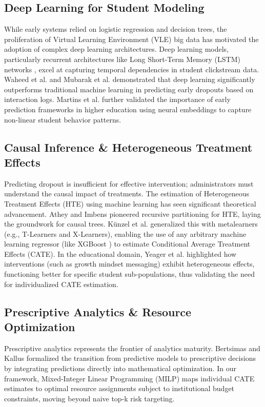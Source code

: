 \documentclass[11pt, a4paper]{article}
\begin{document}
\subsection{Deep Learning for Student Modeling}
While early systems relied on logistic regression and decision trees, the proliferation of Virtual Learning Environment (VLE) big data has motivated the adoption of complex deep learning architectures. Deep learning models, particularly recurrent architectures like Long Short-Term Memory (LSTM) networks \cite{hochreiter1997lstm}, excel at capturing temporal dependencies in student clickstream data. Waheed et al. \cite{waheed2020predicting} and Mubarak et al. \cite{mubarak2022deep} demonstrated that deep learning significantly outperforms traditional machine learning in predicting early dropouts based on interaction logs. Martins et al. \cite{martins2021early} further validated the importance of early prediction frameworks in higher education using neural embeddings to capture non-linear student behavior patterns.

\subsection{Causal Inference \texorpdfstring{\&}{and} Heterogeneous Treatment Effects}
Predicting dropout is insufficient for effective intervention; administrators must understand the causal impact of treatments. The estimation of Heterogeneous Treatment Effects (HTE) using machine learning has seen significant theoretical advancement. Athey and Imbens \cite{athey2016recursive} pioneered recursive partitioning for HTE, laying the groundwork for causal trees. K{\"u}nzel et al. \cite{kunzel2019metalearners} generalized this with metalearners (e.g., T-Learners and X-Learners), enabling the use of any arbitrary machine learning regressor (like XGBoost \cite{chen2016xgboost}) to estimate Conditional Average Treatment Effects (CATE). In the educational domain, Yeager et al. \cite{yeager2019national} highlighted how interventions (such as growth mindset messaging) exhibit heterogeneous effects, functioning better for specific student sub-populations, thus validating the need for individualized CATE estimation.

\subsection{Prescriptive Analytics \texorpdfstring{\&}{and} Resource Optimization}
Prescriptive analytics represents the frontier of analytics maturity. Bertsimas and Kallus \cite{bertsimas2020predictive} formalized the transition from predictive models to prescriptive decisions by integrating predictions directly into mathematical optimization. In our framework, Mixed-Integer Linear Programming (MILP) maps individual CATE estimates to optimal resource assignments subject to institutional budget constraints, moving beyond naive top-k risk targeting.
\end{document}
